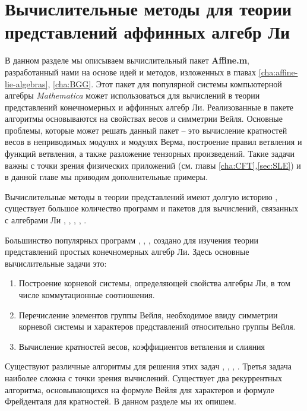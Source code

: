 \section{Вычислительные методы для теории представлений аффинных алгебр Ли}
\label{cha:computational-methods}

В данном разделе мы описываем вычислительный пакет  {\bf Affine.m}, разработанный нами на основе идей и методов, изложенных в главах \ref{cha:affine-lie-algebras}, \ref{cha:BGG}. Этот пакет для популярной системы компьютерной алгебры {\it Mathematica} может использоваться для вычислений в теории представлений конечномерных и аффинных алгебр Ли. Реализованные в пакете алгоритмы основываются на свойствах весов и симметрии Вейля. Основные проблемы, которые может решать данный пакет -- это вычисление кратностей весов в неприводимых модулях и модулях Верма, построение правил ветвления и функций ветвления, а также разложение тензорных произведений. Такие задачи важны с точки зрения физических приложений (см. главы \ref{cha:CFT},\ref{sec:SLE}) и в данной главе мы приводим дополнительные примеры. 

Вычислительные методы в теории представлений имеют долгую историю \cite{belinfante1989survey}, существует большое количество программ и пакетов для вычислений, связанных с алгебрами Ли \cite{simplie}, \cite{vanleeuwen1994lsp}, \cite{stembridge1995mps,coxweyl}, \cite{fischbacher2002ilp}, \cite{Fuchs:1996dd}.

Большинство популярных программ \cite{simplie}, \cite{vanleeuwen1994lsp}, \cite{fischbacher2002ilp}, \cite{coxweyl} создано для изучения теории представлений простых конечномерных алгебр Ли. Здесь основные вычислительные задачи это:
\begin{enumerate}
\item Построение корневой системы, определяющей свойства алгебры Ли, в том числе коммутационные соотношения.
\item Перечисление элементов группы Вейля, необходимое ввиду симметрии корневой системы и характеров представлений относительно группы Вейля.
\item Вычисление кратностей весов, коэффициентов ветвления и слияния
\end{enumerate}
Существуют различные алгоритмы для решения этих задач \cite{moody1982fast}, \cite{stembridge2001computational}, \cite{belinfante1989survey}, \cite{casselman1994machine}.
Третья задача наиболее сложна с точки зрения вычислений. Существует два рекуррентных алгоритма, основывающихся на формуле Вейля для характеров и формуле Фрейденталя для кратностей. В данном разделе мы их опишем.

